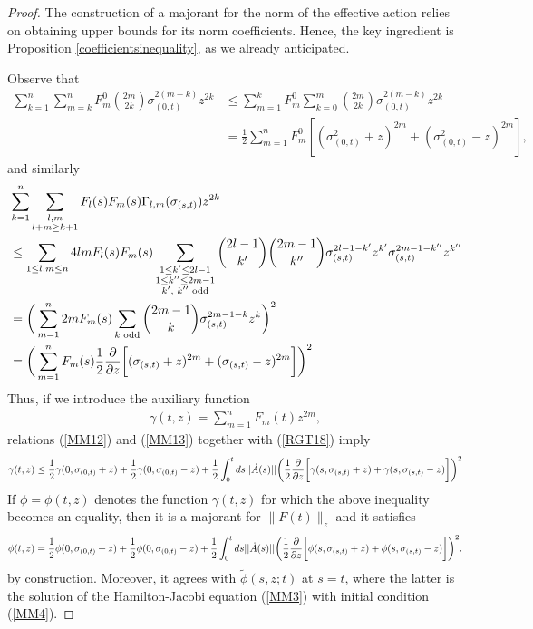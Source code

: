 \documentclass[12pt,twoside]{amsart}
\newcommand{\beq}{\begin{equation}}
\newcommand{\eeq}{\end{equation}}
\numberwithin{equation}{section}
\begin{document}
\begin{proof} The construction of a majorant for the norm of the effective action relies on obtaining upper bounds for its norm coefficients. Hence, the key ingredient is Proposition \ref{coefficientsinequality}, as we already anticipated. 

Observe that
\beq
\begin{split}
\sum_{k=1}^{n}\sum_{m=k}^{n}F_{m}^{0}\binom{2m}{2k}\sigma_{(0,t)}^{2(m-k)}z^{2k} 
&\le 
\sum_{m=1}^{k}F_{m}^{0}\sum_{k=0}^{m}\binom{2m}{2k}\sigma_{(0,t)}^{2(m-k)}z^{2k} 
\\
&= 
\frac{1}{2}\sum_{m=1}^{n}F_{m}^{0}[(\sigma_{(0,t)}^{2}+z)^{2m}+(\sigma_{(0,t)}^{2}-z)^{2m}], 
\end{split}\label{MM12}
\eeq
and similarly
\beq
\begin{split}
&\sum_{k=1}^{n}\sum_{\substack{l,m \\ l+m \ge k+1}} F_{l}(s)F_{m}(s)\Gamma_{l,m}(\sigma_{(s,t)})z^{2k} \\
&\le  \sum_{1 \le l,m \le n}4lm F_{l}(s)F_{m}(s)\sum_{\substack{1 \le k' \le 2l-1 \\ 1 \le k'' \le 2m-1 \\ \textup{$k'$, $k''$ odd}}}\binom{2l-1}{k'}\binom{2m-1}{k''}\sigma_{(s,t)}^{2l-1-k'}z^{k'}\sigma_{(s,t)}^{2m-1-k''}z^{k''}  \\
&= \bigg{(}\sum_{m=1}^{n}2mF_{m}(s)\sum_{\textup{$k$ odd}}\binom{2m-1}{k}\sigma_{(s,t)}^{2m-1-k}z^{k}\bigg{)}^{2} \\
&=\bigg{(}\sum_{m=1}^{n}F_{m}(s) \frac{1}{2}\frac{\partial}{\partial z}\bigg{[}(\sigma_{(s,t)}+z)^{2m}+(\sigma_{(s,t)}-z)^{2m}\bigg{]}\bigg{)}^{2} 
\end{split}
\label{MM13}
\eeq
Thus, if we introduce the auxiliary function
\begin{eqnarray}
\gamma(t,z) = \sum_{m=1}^{n}F_{m}(t)z^{2m}, \nonumber
\end{eqnarray}
relations (\ref{MM12}) and (\ref{MM13}) together with (\ref{RGT18}) imply
\beq
\gamma(t,z) \le \frac{1}{2}\gamma(0,\sigma_{(0,t)}+z)+\frac{1}{2}\gamma(0,\sigma_{(0,t)}-z) + \frac{1}{2}\int_{0}^{t}ds ||\dot{A}(s)|| \bigg{(}\frac{1}{2}\frac{\partial}{\partial z}\bigg{[}\gamma(s, \sigma_{(s,t)}+z)+\gamma(s,\sigma_{(s,t)}-z)\bigg{]}\bigg{)}^{2}\nonumber 
\eeq
If $\phi = \phi(t,z)$ denotes the function $\gamma(t,z)$ for which the above inequality becomes an equality, then it is a majorant for $\|F(t)\|_{z}$ and it satisfies
\beq
\phi(t,z) = \frac{1}{2}\phi(0,\sigma_{(0,t)}+z)+\frac{1}{2}\phi(0,\sigma_{(0,t)}-z) + \frac{1}{2}\int_{0}^{t}ds ||\dot{A}(s)|| \bigg{(}\frac{1}{2}\frac{\partial}{\partial z}\bigg{[}\phi(s, \sigma_{(s,t)}+z)+\phi(s,\sigma_{(s,t)}-z)\bigg{]}\bigg{)}^{2}.\label{MM14}
\eeq
by construction. Moreover, it agrees with $\tilde{\phi}(s,z;t)$ at $s=t$, where the latter is the solution of the Hamilton-Jacobi equation (\ref{MM3}) with initial condition (\ref{MM4}). 




\end{proof}
\end{document}
